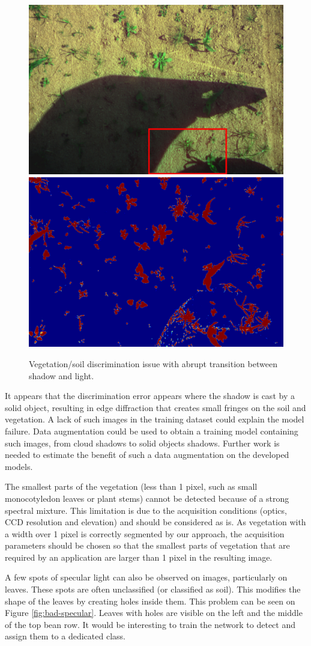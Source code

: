 \documentclass[../thesis.tex]{subfiles}
\begin{document}
	\begin{figure}[H]
		\centering
		\includegraphics[width=0.45\linewidth]{img/idx/0400-false}
		\includegraphics[width=0.45\linewidth]{img/idx/0400}
		\caption{Vegetation/soil discrimination issue with abrupt transition between shadow and light.}
		\label{fig:bad-vi-soil-discrimination}
	\end{figure}
	
	It appears that the discrimination error appears where the shadow is cast by a solid object, resulting in edge diffraction that creates small fringes on the soil and vegetation. A lack of such images in the training dataset could explain the model failure. Data augmentation could be used to obtain a training model containing such images, from cloud shadows to solid objects shadows. Further work is needed to estimate the benefit of such a data augmentation on the developed models.
	
	The smallest parts of the vegetation (less than 1 pixel, such as small monocotyledon leaves or plant stems) cannot be detected because of a strong spectral mixture. This limitation is due to the acquisition conditions (optics, CCD resolution and elevation) and should be considered as is. As vegetation with a width over 1 pixel is correctly segmented by our approach, the acquisition parameters should be chosen so that the smallest parts of vegetation that are required by an application are larger than 1 pixel in the resulting image.
	
	A few spots of specular light can also be observed on images, particularly on leaves. These spots are often unclassified (or classified as soil). This modifies the shape of the leaves by creating holes inside them. This problem can be seen on Figure \ref{fig:bad-specular}. Leaves with holes are visible on the left and the middle of the top bean row. It would be interesting to train the network to detect and assign them to a dedicated class. 
	
\end{document}
